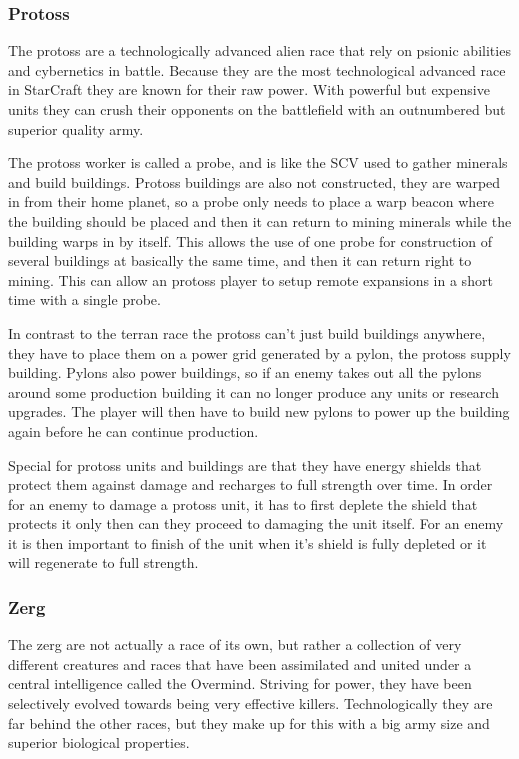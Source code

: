\subsubsection{Protoss}
The protoss are a technologically advanced alien race that rely on psionic
abilities and cybernetics in battle. Because they are the most technological
advanced race in StarCraft they are known for their raw power. With powerful but
expensive units they can crush their opponents on the battlefield with an
outnumbered but superior quality army.

The protoss worker is called a probe, and is like the SCV used to gather
minerals and build buildings. Protoss buildings are also not constructed, they
are warped in from their home planet, so a probe only needs to place a warp
beacon where the building should be placed and then it can return to mining
minerals while the building warps in by itself. This allows the use of one
probe for construction of several buildings at basically the same time, and then
it can return right to mining. This can allow an protoss player to setup remote
expansions in a short time with a single probe. 

In contrast to the terran race the protoss can't just build buildings anywhere,
they have to place them on a power grid generated by a pylon, the protoss supply
building. Pylons also power buildings, so if an enemy takes out all the pylons
around some production building it can no longer produce any units or research
upgrades. The player will then have to build new pylons to power up the building
again before he can continue production. 

Special for protoss units and buildings are that they have energy shields that
protect them against damage and recharges to full strength over time. In order
for an enemy to damage a protoss unit, it has to first deplete the shield that
protects it only then can they proceed to damaging the unit itself. For an enemy
it is then important to finish of the unit when it's shield is fully depleted or
it will regenerate to full strength. 

\subsubsection{Zerg}
The zerg are not actually a race of its own, but rather a collection of very
different creatures and races that have been assimilated and united under a
central intelligence called the Overmind. Striving for power, they have been
selectively evolved towards being very effective killers. Technologically they
are far behind the other races, but they make up for this with a big army size
and superior biological properties. 

